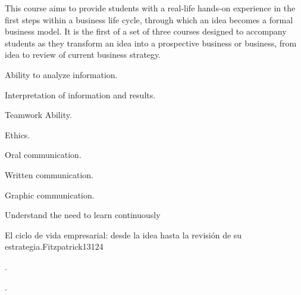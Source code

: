 \begin{syllabus}


\begin{justification}
This course aims to provide students with a real-life hands-on experience in the first steps within a business life cycle, through which an idea becomes a formal business model.
It is the first of a set of three courses designed to accompany students as they transform an idea into a prospective business or business, from idea to review of current business strategy.
\end{justification}

\begin{goals}
   \item Ability to analyze information.
   \item Interpretation of information and results.
   \item Teamwork Ability.
   \item Ethics.
   \item Oral communication.
   \item Written communication.
   \item Graphic communication.
   \item Understand the need to learn continuously
\end{goals}

\begin{outcomes}
\end{outcomes}

\begin{competences}
    \item {}
    \item {}
    \item {}
\end{competences}


\begin{unit}{El ciclo de vida empresarial: desde la idea hasta la revisión de su estrategia.}{}{Fitzpatrick13}{12}{4}
   \begin{topics}
      \item .
   \end{topics}
   \begin{learningoutcomes}
      \item .
   \end{learningoutcomes}
\end{unit}


\end{syllabus}
